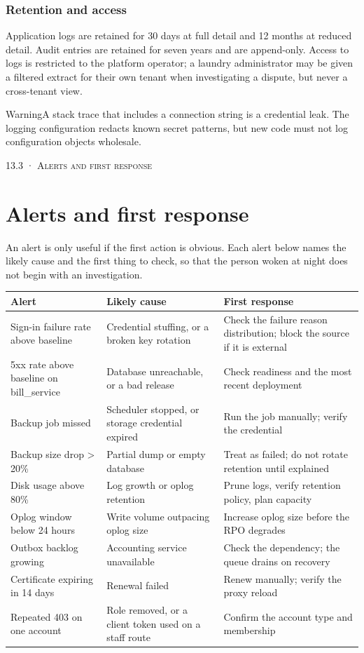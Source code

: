 \documentclass[11pt,a4paper,oneside]{book}
\begin{document}
\subsubsection*{Retention and access}
Application logs are retained for 30 days at full detail and 12 months at reduced detail. Audit entries are retained for seven years and are append-only. Access to logs is restricted to the platform operator; a laundry administrator may be given a filtered extract for their own tenant when investigating a dispute, but never a cross-tenant view.

\begin{notebox}WarningA stack trace that includes a connection string is a credential leak. The logging configuration redacts known secret patterns, but new code must not log configuration objects wholesale.\end{notebox}
\textsc{\small\color{crimson}13.3 · Alerts and first response}\par\medskip
\section*{Alerts and first response}
An alert is only useful if the first action is obvious. Each alert below names the likely cause and the first thing to check, so that the person woken at night does not begin with an investigation.

\begin{center}\small
\begin{tabularx}{\linewidth}{|X|X|X|}
\hline
\rowcolor{lightgrey}
\textbf{Alert} & \textbf{Likely cause} & \textbf{First response} \\ \hline
Sign-in failure rate above baseline & Credential stuffing, or a broken key rotation & Check the failure reason distribution; block the source if it is external \\ \hline
5xx rate above baseline on bill\_service & Database unreachable, or a bad release & Check readiness and the most recent deployment \\ \hline
Backup job missed & Scheduler stopped, or storage credential expired & Run the job manually; verify the credential \\ \hline
Backup size drop > 20\% & Partial dump or empty database & Treat as failed; do not rotate retention until explained \\ \hline
Disk usage above 80\% & Log growth or oplog retention & Prune logs, verify retention policy, plan capacity \\ \hline
Oplog window below 24 hours & Write volume outpacing oplog size & Increase oplog size before the RPO degrades \\ \hline
Outbox backlog growing & Accounting service unavailable & Check the dependency; the queue drains on recovery \\ \hline
Certificate expiring in 14 days & Renewal failed & Renew manually; verify the proxy reload \\ \hline
Repeated 403 on one account & Role removed, or a client token used on a staff route & Confirm the account type and membership \\ \hline
\end{tabularx}
\end{center}
\end{document}
